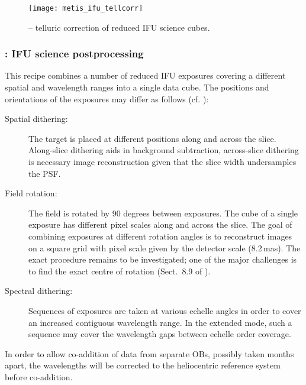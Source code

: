 \begin{figure}[hb]
  \centering
  \texttt{[image: metis\_ifu\_tellcorr]}
  \caption[Recipe: ]{
    -- telluric correction of reduced IFU science cubes.}
  \label{fig:metis_ifu_tellcorr}
\end{figure}


\clearpage
\subsubsection{: IFU science postprocessing}
\label{sssec:ifu_sci_postprocess}
\label{rec:metis_ifu_sci_postprocess}

This recipe combines a number of reduced IFU exposures covering a
different spatial and wavelength ranges into a single data cube. The
positions and orientations of the exposures may differ as follows (cf. \cite{METIS-operational_concept}): %
\begin{description}
\item[Spatial dithering:] The target is placed at different positions
  along and across the slice. Along-slice dithering aids in background
  subtraction, across-slice dithering is necessary image
  reconstruction given that the slice width undersamples the PSF.
\item[Field rotation:] The field is rotated by 90 degrees between
  exposures. The cube of a single exposure has different pixel scales
  along and across the slice. The goal of combining exposures at
  different rotation angles is to reconstruct images on a square grid
  with pixel scale given by the detector scale (8.2\,mas). The exact
  procedure remains to be investigated; one of the major challenges is
  to find the exact centre of rotation
  (Sect.~8.9 of \cite{DRLS}).
\item[Spectral dithering:] Sequences of exposures are taken at various
  echelle angles in order to cover an increased contiguous wavelength
  range. In the extended mode, such a sequence may cover the
  wavelength gaps between echelle order coverage.
\end{description}

In order to allow co-addition of data from separate OBs, possibly taken
months apart, the wavelengths will be corrected to the heliocentric
reference system before co-addition.

